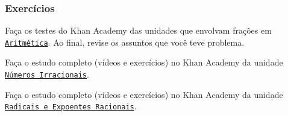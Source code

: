 \begin{frame}
	\frametitle{Exercícios}
	
	\begin{exercicio}
		Faça os testes do Khan Academy das unidades que envolvam frações em
\href{https://pt.khanacademy.org/math/arithmetic}
{{\tt Aritmética}}. Ao final, revise os assuntos que você teve
problema. 
	\end{exercicio}

	\begin{exercicio}
		Faça o estudo completo (vídeos e exercícios) no Khan Academy da unidade
\href{https://pt.khanacademy.org/math/algebra/x2f8bb11595b61c86:irrational-numbers}
{{\tt Números Irracionais}}.
	\end{exercicio}

	\begin{exercicio}
		Faça o estudo completo (vídeos e exercícios) no Khan Academy da unidade
\href{https://pt.khanacademy.org/math/algebra2/x2ec2f6f830c9fb89:exp}
{{\tt Radicais e Expoentes Racionais}}.
	\end{exercicio}
\end{frame}


%	

